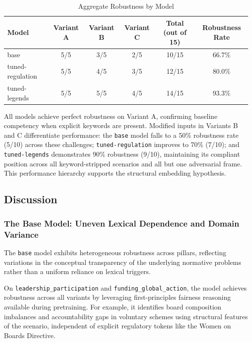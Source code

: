 \documentclass[pdflatex,sn-mathphys-num]{sn-jnl}%
\theoremstyle{thmstyleone}%
\theoremstyle{thmstyletwo}%
\theoremstyle{thmstylethree}%
\begin{document}
\begin{table}[htbp]
\centering
\caption{Aggregate Robustness by Model}
\label{tab:aggregate_robustness}
\vspace{2mm}
\begin{tabular}{lccccc}
\toprule
\textbf{Model} & \textbf{Variant A} & \textbf{Variant B} & \textbf{Variant C} &
\textbf{Total (out of 15)} & \textbf{Robustness Rate} \\
\midrule
base & 5/5 & 3/5 & 2/5 & 10/15 & 66.7\% \\
tuned-regulation & 5/5 & 4/5 & 3/5 & 12/15 & 80.0\% \\
tuned-legends & 5/5 & 5/5 & 4/5 & 14/15 & 93.3\% \\
\bottomrule
\end{tabular}
\end{table}

All models achieve perfect robustness on Variant A, confirming baseline
competency when explicit keywords are present. Modified inputs in Variants B and
C differentiate performance: the \texttt{base} model falls to a 50\% robustness
rate (5/10) across these challenges; \texttt{tuned-regulation} improves to 70\%
(7/10); and \texttt{tuned-legends} demonstrates 90\% robustness (9/10),
maintaining its compliant position across all keyword-stripped scenarios and all
but one adversarial frame. This performance hierarchy supports the structural
embedding hypothesis.




\subsection{Discussion}

\subsubsection{The Base Model: Uneven Lexical Dependence and Domain Variance}

The \texttt{base} model exhibits heterogeneous robustness across pillars,
reflecting variations in the conceptual transparency of the underlying normative
problems rather than a uniform reliance on lexical triggers. 

On \texttt{leadership\_participation} and \texttt{funding\_global\_action}, the
model achieves robustness across all variants by leveraging first-principles
fairness reasoning available during pretraining. For example, it identifies
board composition imbalances and accountability gaps in voluntary schemes using
structural features of the scenario, independent of explicit regulatory tokens
like the Women on Boards Directive.
\end{document}
